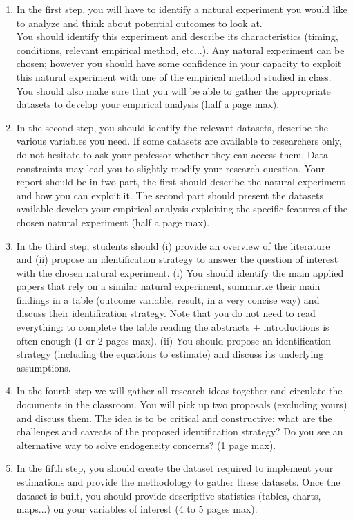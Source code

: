 \documentclass[a4paper,french,11pt]{article}
\begin{document}
\begin{enumerate}
  \item In the first step, you will have to identify a natural experiment you would like to analyze and think about potential outcomes to look at.\\
  You should identify this experiment and describe its characteristics (timing, conditions, relevant empirical method, etc...). Any natural experiment can be chosen; however you should have some confidence in your capacity to exploit this natural experiment with one of the empirical method studied in class. You should also make sure that you will be able to gather the appropriate datasets to develop your empirical analysis (half a page max). 
  \item In the second step, you should identify the relevant datasets, describe the various variables you need. If some datasets are available to researchers only, do not hesitate to ask your professor whether they can access them. Data constraints may lead you to slightly modify your research question. Your report should be in two part, the first should describe the natural experiment and how you can exploit it. The second part should present the datasets available develop your empirical analysis exploiting the specific features of the chosen natural experiment (half a page max). 
  \item In the third step, students should (i) provide an overview of the literature and (ii) propose an identification strategy to answer the question of interest with the chosen natural experiment. (i) You should identify the main applied papers that rely on a similar natural experiment, summarize their main findings in a table (outcome variable, result, in a very concise way) and discuss their identification strategy. Note that you do not need to read everything: to complete the table reading the abstracts + introductions is often enough (1 or 2 pages max). (ii) You should propose an identification strategy (including the equations to estimate) and discuss its underlying assumptions.
  \item In the fourth step we will gather all research ideas together and circulate the documents in the classroom. You will pick up two proposals (excluding yours) and discuss them. The idea is to be critical and constructive: what are the challenges and caveats of the proposed identification strategy? Do you see an alternative way to solve endogeneity concerns? (1 page max). 
  \item In the fifth step, you should create the dataset required to implement your estimations and provide the methodology to gather these datasets. Once the dataset is built, you should provide descriptive statistics (tables, charts, maps...) on your variables of interest (4 to 5 pages max). 

\end{enumerate}
\end{document}
